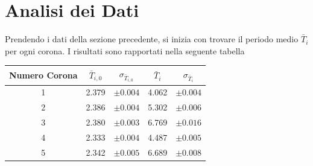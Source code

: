 \documentclass[a4paper]{article}
\begin{document}
\section{Analisi dei Dati}
Prendendo i dati della sezione precedente, si inizia con trovare il periodo medio $\bar{T}_i$ per ogni corona. I risultati sono rapportati nella seguente tabella
\begin{table}
    \centering
    \begin{tabular}{|c|c|c|c|c|}
        \hline
        Numero Corona & $\bar{T}_{i,0}$ & $\sigma_{\bar{T}_{i,0}}$ & $\bar{T}_{i}$ & $\sigma_{\bar{T}_{i}}$ \\
        \hline
        1 & 2.379 & $\pm{0.004}$ & 4.062 & $\pm{0.004}$ \\
        2 & 2.386 & $\pm{0.004}$ & 5.302 & $\pm{0.006}$ \\
        3 & 2.380 & $\pm{0.003}$ & 6.769 & $\pm{0.016}$ \\
        4 & 2.333 & $\pm{0.004}$ & 4.487 & $\pm{0.005}$ \\
        5 & 2.342 & $\pm{0.005}$ & 6.689 & $\pm{0.008}$ \\
        \hline
    \end{tabular}
\end{table}
\FloatBarrier
\end{document}
